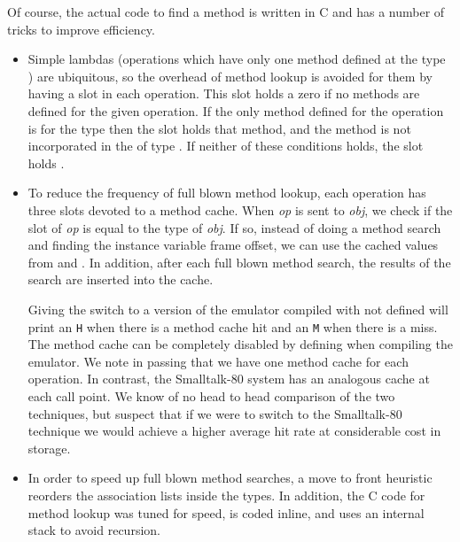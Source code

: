 Of course, the actual code to find a method is written in C and has a
number of tricks to improve efficiency.

\begin{itemize}

\item
Simple lambdas (operations which have only one method defined at the
type ) are ubiquitous, so the overhead of method lookup is
avoided for them by having a  slot in each operation.
This slot holds a zero if no methods are defined for the given
operation.  If the only method defined for the operation is for the
type  then the  slot holds that method, and the
method is not incorporated in the  of type
.  If neither of these conditions holds, the
 slot holds .

\item
To reduce the frequency of full blown method lookup, each operation
has three slots devoted to a method cache.  When \emph{op} is sent to
\emph{obj}, we check if the  slot of \emph{op} is equal
to the type of \emph{obj}.  If so, instead of doing a method search and
finding the instance variable frame offset, we can use the cached
values from  and .  In addition,
after each full blown method search, the results of the search are
inserted into the cache.

Giving the  switch to a version of the emulator compiled with
 not defined will print an \texttt{H} when there is a
method cache hit and an \texttt{M} when there is a miss.  The method
cache can be completely disabled by defining
 when compiling the emulator.  We
note in passing that we have one method cache for each operation.  In
contrast, the Smalltalk-80  system has an
analogous cache at each call point.  We know of no head to head
comparison of the two techniques, but suspect that if we were to
switch to the Smalltalk-80 technique we would achieve a higher average
hit rate at considerable cost in storage.

\item
In order to speed up full blown method searches, a move to front
heuristic reorders the association lists inside the types.  In
addition, the C code for method lookup was tuned for speed, is coded
inline, and uses an internal stack to avoid recursion.
\end{itemize}

